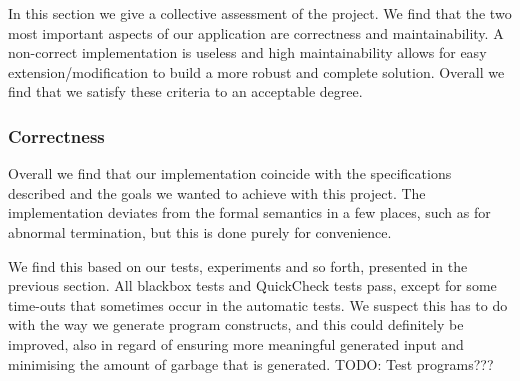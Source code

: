 In this section we give a collective assessment of the project.
We find that the two most important aspects of our application are correctness and maintainability. A non-correct implementation is useless and high maintainability allows for easy extension/modification to build a more robust and complete solution.
Overall we find that we satisfy these criteria to an acceptable degree.



\subsubsection{Correctness}
Overall we find that our implementation coincide with the specifications described and the goals we wanted to achieve with this project.
The implementation deviates from the formal semantics in a few places, such as for abnormal termination, but this is done purely for convenience.

We find this based on our tests, experiments and so forth, presented in the previous section.
All blackbox tests and QuickCheck tests pass, except for some time-outs that sometimes occur in the automatic tests. We suspect this has to do with the way we generate program constructs, and this could definitely be improved, also in regard of ensuring more meaningful generated input and minimising the amount of garbage that is generated.
TODO: Test programs???

